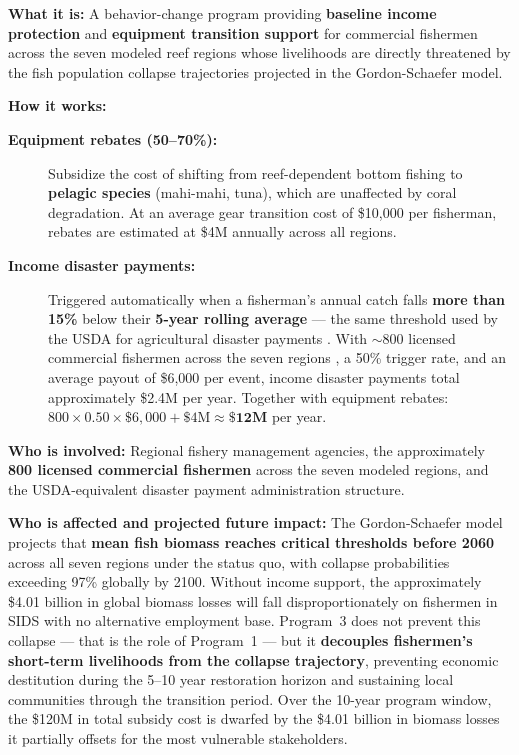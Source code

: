 \documentclass[10pt,letterpaper]{article}
\begin{document}
\medskip

\begin{tcolorbox}[title=Program 3: Fishermen Income Subsidies --- \$12M Annual Total,
  colback=orange!5, colframe=orange!60!black, fonttitle=\bfseries, breakable]

  \textbf{What it is:} A behavior-change program providing \textbf{baseline income protection}
  and \textbf{equipment transition support} for commercial fishermen across the seven modeled
  reef regions whose livelihoods are directly threatened by the fish population collapse
  trajectories projected in the Gordon-Schaefer model.

  \medskip
  \textbf{How it works:}
  \begin{description}
    \item[\textbf{Equipment rebates (50--70\%):}] Subsidize the cost of shifting from
    reef-dependent bottom fishing to \textbf{pelagic species} (mahi-mahi, tuna), which are
    unaffected by coral degradation. At an average gear transition cost of \$10,000 per
    fisherman, rebates are estimated at \$4M annually across all regions.

    \item[\textbf{Income disaster payments:}] Triggered automatically when a fisherman's annual
    catch falls \textbf{more than 15\%} below their \textbf{5-year rolling average} --- the same
    threshold used by the USDA for agricultural disaster payments \cite{usda_disaster}. With
    $\sim$800 licensed commercial fishermen across the seven regions \cite{fwc_fishing_records,
    noaa_rvc}, a 50\% trigger rate, and an average payout of \$6,000 per event, income disaster
    payments total approximately \$2.4M per year. Together with equipment rebates:
    $800 \times 0.50 \times \$6{,}000 + \$4\text{M} \approx \mathbf{\$12\text{M}}$ per year.
  \end{description}

  \medskip
  \textbf{Who is involved:} Regional fishery management agencies, the approximately \textbf{800
  licensed commercial fishermen} across the seven modeled regions, and the USDA-equivalent
  disaster payment administration structure.

  \medskip
  \textbf{Who is affected and projected future impact:} The Gordon-Schaefer model projects that
  \textbf{mean fish biomass reaches critical thresholds before 2060} across all seven regions
  under the status quo, with collapse probabilities exceeding 97\% globally by 2100. Without
  income support, the approximately \$4.01 billion in global biomass losses will fall
  disproportionately on fishermen in SIDS with no alternative employment base. Program~3 does
  not prevent this collapse --- that is the role of Program~1 --- but it \textbf{decouples
  fishermen's short-term livelihoods from the collapse trajectory}, preventing economic
  destitution during the 5--10 year restoration horizon and sustaining local communities through
  the transition period. Over the 10-year program window, the \$120M in total subsidy cost is
  dwarfed by the \$4.01 billion in biomass losses it partially offsets for the most vulnerable
  stakeholders.
\end{tcolorbox}
\end{document}
